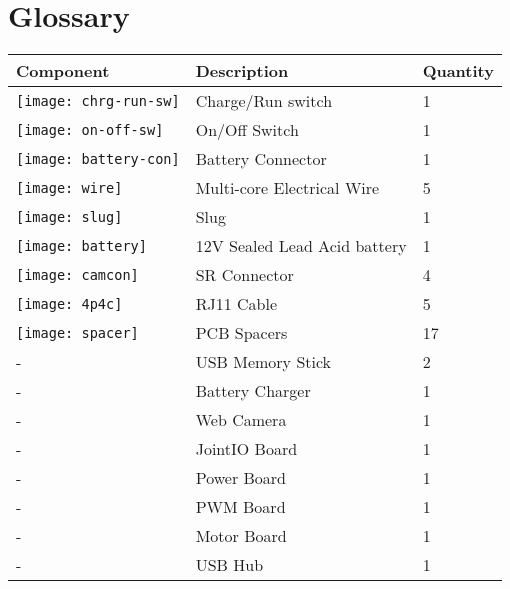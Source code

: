 
\section{Glossary}
\label{sec:glossary}
\begin{longtable}{| l | l| l |}
\hline
\textbf{Component} & \textbf{Description} & \textbf{Quantity} \\ \hline
\texttt{[image: chrg-run-sw]}  & Charge/Run switch & 1 \\ \hline
\texttt{[image: on-off-sw]}  & On/Off Switch & 1 \\ \hline
\texttt{[image: battery-con]}  & Battery Connector & 1 \\ \hline
\texttt{[image: wire]}  & Multi-core Electrical Wire & 5 \\ \hline
\texttt{[image: slug]}  & Slug & 1 \\ \hline
\texttt{[image: battery]}  & 12V Sealed Lead Acid battery & 1 \\ \hline
\texttt{[image: camcon]}  & SR Connector & 4 \\ \hline
\texttt{[image: 4p4c]}  & RJ11 Cable & 5 \\ \hline
\texttt{[image: spacer]}  & PCB Spacers & 17 \\ \hline
-  & USB Memory Stick & 2 \\ \hline
-  & Battery Charger & 1 \\ \hline
- & Web Camera & 1 \\ \hline
- & JointIO Board & 1 \\ \hline
- & Power Board & 1 \\ \hline
- & PWM Board & 1 \\ \hline
- & Motor Board & 1 \\ \hline
 - & USB Hub & 1 \\ \hline
\end{longtable}
